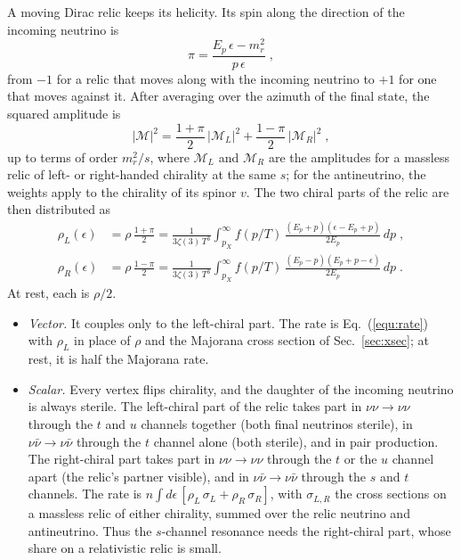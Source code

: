 \documentclass[11pt]{article}
\newcommand{\nubar}{\bar\nu}
\begin{document}
A moving Dirac relic keeps its helicity.
Its spin along the direction of the incoming neutrino is
\begin{equation}
 \pi = \frac{E_p\, \epsilon - m_r^2}{p\, \epsilon} \;,
\end{equation}
from $-1$ for a relic that moves along with the incoming neutrino to $+1$ for one that moves against it.
After averaging over the azimuth of the final state, the squared amplitude is
\begin{equation}
 |\mathcal{M}|^2 = \frac{1+\pi}{2}\, |\mathcal{M}_L|^2 + \frac{1-\pi}{2}\, |\mathcal{M}_R|^2 \;,
\end{equation}
up to terms of order $m_r^2/s$, where $\mathcal{M}_L$ and $\mathcal{M}_R$ are the amplitudes for a massless relic of left- or right-handed chirality at the same $s$; for the antineutrino, the weights apply to the chirality of its spinor $v$.
The two chiral parts of the relic are then distributed as
\begin{align}
 \rho_L(\epsilon) &= \rho\, \frac{1+\pi}{2} = \frac{1}{3\zeta(3)\, T^3} \int_{p_X}^\infty f(p/T)\, \frac{(E_p + p)(\epsilon - E_p + p)}{2E_p}\, dp \;, \\
 \rho_R(\epsilon) &= \rho\, \frac{1-\pi}{2} = \frac{1}{3\zeta(3)\, T^3} \int_{p_X}^\infty f(p/T)\, \frac{(E_p - p)(E_p + p - \epsilon)}{2E_p}\, dp \;.
\end{align}
At rest, each is $\rho/2$.
\begin{itemize}
 \item \textit{Vector.} It couples only to the left-chiral part. The rate is Eq.~(\ref{equ:rate}) with $\rho_L$ in place of $\rho$ and the Majorana cross section of Sec.~\ref{sec:xsec}; at rest, it is half the Majorana rate.
 \item \textit{Scalar.} Every vertex flips chirality, and the daughter of the incoming neutrino is always sterile. The left-chiral part of the relic takes part in $\nu\nu \to \nu\nu$ through the $t$ and $u$ channels together (both final neutrinos sterile), in $\nu\nubar \to \nu\nubar$ through the $t$ channel alone (both sterile), and in pair production. The right-chiral part takes part in $\nu\nu \to \nu\nu$ through the $t$ or the $u$ channel apart (the relic's partner visible), and in $\nu\nubar \to \nu\nubar$ through the $s$ and $t$ channels. The rate is $n \int d\epsilon\, [\rho_L\, \sigma_L + \rho_R\, \sigma_R]$, with $\sigma_{L,R}$ the cross sections on a massless relic of either chirality, summed over the relic neutrino and antineutrino. Thus the $s$-channel resonance needs the right-chiral part, whose share on a relativistic relic is small.
\end{itemize}
\end{document}
